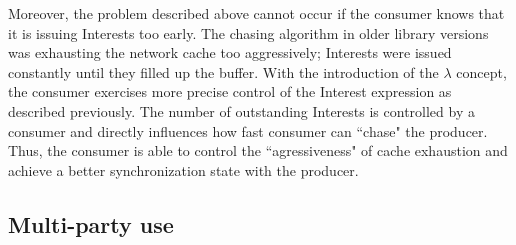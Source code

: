 \documentclass{icn/sig-alternate-2013} %
\begin{document}

Moreover, the problem described above cannot occur if the consumer knows that it is issuing Interests too early. The chasing algorithm in older library versions was exhausting the network cache too aggressively; Interests were issued constantly until they filled up the buffer.  With the introduction of the $\lambda$ concept, the consumer exercises more precise control of the Interest expression as described previously. 
The number of outstanding Interests is controlled by a consumer and directly influences how fast consumer can ``chase" the producer. Thus, the consumer is able to control the ``agressiveness" of cache exhaustion and achieve a better synchronization state with the producer.






\subsection{Multi-party use}
\end{document}
